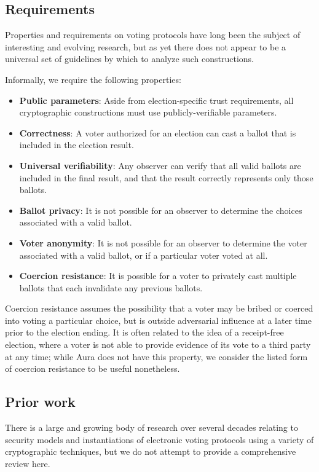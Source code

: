 \documentclass{llncs}
\begin{document}
\subsection{Requirements}

Properties and requirements on voting protocols have long been the subject of interesting and evolving research, but as yet there does not appear to be a universal set of guidelines by which to analyze such constructions.

Informally, we require the following properties:
\begin{itemize}
    \item \textbf{Public parameters}: Aside from election-specific trust requirements, all cryptographic constructions must use publicly-verifiable parameters.
    \item \textbf{Correctness}: A voter authorized for an election can cast a ballot that is included in the election result.
    \item \textbf{Universal verifiability}: Any observer can verify that all valid ballots are included in the final result, and that the result correctly represents only those ballots.
    \item \textbf{Ballot privacy}: It is not possible for an observer to determine the choices associated with a valid ballot.
    \item \textbf{Voter anonymity}: It is not possible for an observer to determine the voter associated with a valid ballot, or if a particular voter voted at all.
    \item \textbf{Coercion resistance}: It is possible for a voter to privately cast multiple ballots that each invalidate any previous ballots.
\end{itemize}

Coercion resistance assumes the possibility that a voter may be bribed or coerced into voting a particular choice, but is outside adversarial influence at a later time prior to the election ending.
It is often related to the idea of a receipt-free election, where a voter is not able to provide evidence of its vote to a third party at any time; while Aura does not have this property, we consider the listed form of coercion resistance to be useful nonetheless.


\subsection{Prior work}

There is a large and growing body of research over several decades relating to security models and instantiations of electronic voting protocols using a variety of cryptographic techniques, but we do not attempt to provide a comprehensive review here.
\end{document}
